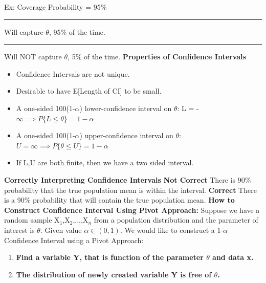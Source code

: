\documentclass[]{article}
\begin{document}
\newline
\newline Ex: Coverage Probability = 95$\%$
\newline\Large\rule{1.3cm}{0pt} Will capture $\theta$, 95$\%$ of the time.
\newline\Large\rule{1.3cm}{0pt} Will NOT capture $\theta$, 5$\%$ of the time.
\newline
\newline\Large\textbf{Properties of Confidence Intervals}
\begin{itemize}
	\item Confidence Intervals are not unique.
	\item Desirable to have E[Length of CI] to be small.
	\item A one-sided 100(1-$\alpha$) lower-confidence interval on $\theta$:  L = -$\infty  \implies P\{ L \le \theta \} = 1-\alpha$
	\item A one-sided 100(1-$\alpha$) upper-confidence interval on $\theta$: $U = \infty  \implies P\{ \theta \le U \} = 1-\alpha$
	\item If L,U are both finite, then we have a two sided interval.
\end{itemize}
\Large\textbf{Correctly Interpreting Confidence Intervals}
\newline \textbf{Not Correct}
\newline There is 90$\%$ probability that the true population mean is within the interval.
\newline \textbf{Correct}
\newline There is a 90$\%$ probability that  will contain the true population mean.
\newline
\newline\textbf{How to Construct Confidence Interval Using Pivot Approach:} 
\newline Suppose we have a random sample X$_1$,X$_2$,...,X$_n$ from a population distribution and the parameter of interest is $\theta$.
\newline
\newline Given value $\alpha \in (0,1)$. We would like to construct a 1-$\alpha$ Confidence Interval using a Pivot Approach:
\begin{enumerate}
	\item\textbf{Find a variable Y, that is function of the parameter $\theta$ and data x.}
	\item\textbf{The distribution of newly created variable Y is free of $\theta$.}
\end{enumerate}
\end{document}
